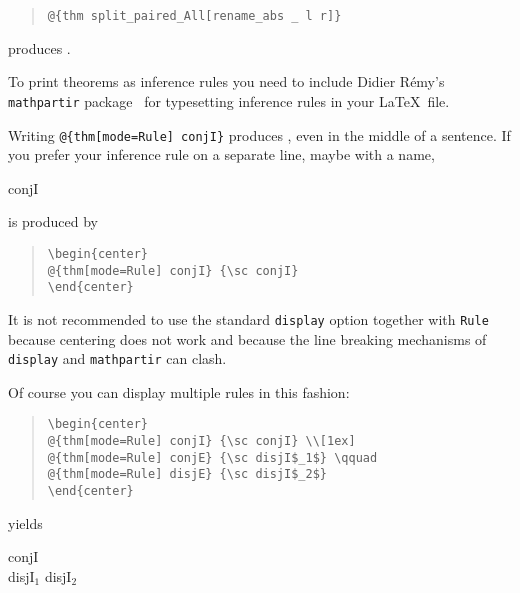 \begin{isabellebody}
\begin{isamarkuptext}
\begin{quote}
\verb!@!\verb!{thm split_paired_All[rename_abs _ l r]}!
\end{quote}
produces .%
\end{isamarkuptext}%
\isamarkuptrue%
%
\isamarkuptrue%
%
\begin{isamarkuptext}%
To print theorems as inference rules you need to include Didier
R\'emy's \texttt{mathpartir} package~\cite{mathpartir}
for typesetting inference rules in your \LaTeX\ file.

Writing \verb!@!\verb!{thm[mode=Rule] conjI}! produces
, even in the middle of a sentence.
If you prefer your inference rule on a separate line, maybe with a name,
\begin{center}
 {\sc conjI}
\end{center}
is produced by
\begin{quote}
\verb!\begin{center}!\\
\verb!@!\verb!{thm[mode=Rule] conjI} {\sc conjI}!\\
\verb!\end{center}!
\end{quote}
It is not recommended to use the standard \texttt{display} option
together with \texttt{Rule} because centering does not work and because
the line breaking mechanisms of \texttt{display} and \texttt{mathpartir} can
clash.

Of course you can display multiple rules in this fashion:
\begin{quote}
\verb!\begin{center}!\\
\verb!@!\verb!{thm[mode=Rule] conjI} {\sc conjI} \\[1ex]!\\
\verb!@!\verb!{thm[mode=Rule] conjE} {\sc disjI$_1$} \qquad!\\
\verb!@!\verb!{thm[mode=Rule] disjE} {\sc disjI$_2$}!\\
\verb!\end{center}!
\end{quote}
yields
\begin{center}\small
{} {\sc conjI} \\[1ex]
 {\sc disjI$_1$} \qquad
{} {\sc disjI$_2$}
\end{center}


\end{isamarkuptext}
\end{isabellebody}

